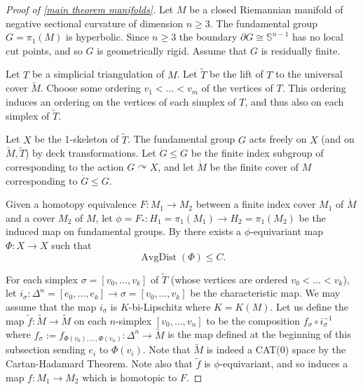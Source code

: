 \documentclass{amsart}
\numberwithin{equation}{section}
\theoremstyle{definition}
\newcommand{\bbS}{\mathbb{S}}
\newcommand{\actson}{\curvearrowright}
\newcommand{\homeo}{\cong}
\newcommand{\ii}{^{-1}}
\newcommand{\tild}[1]{\widetilde{#1}}
\DeclareMathOperator{\AD}{AvgDist}
\begin{document}
\begin{proof}[Proof of \cref{main theorem manifolds}]
Let $M$ be a closed Riemannian manifold of negative sectional curvature of dimension $n\ge 3$. 
The fundamental group $G = \pi_1(M)$ is hyperbolic. Since $n\ge 3$ the boundary $\partial G\homeo \bbS^{n-1}$ has no local cut points, and so $G$ is geometrically rigid.
Assume that $G$ is residually finite.

Let $T$ be a simplicial triangulation of $M$.
Let $\tild T$ be the lift of $T$ to the universal cover $\tild M$. 
Choose some ordering $v_1<\dots <v_m$ of the vertices of $T$. 
This ordering induces an ordering on the vertices of each simplex of $T$, and thus also on each simplex of $\tild T$.



Let $X$ be the 1-skeleton of $\tild T$.
The fundamental group $G$ acts freely on $X$ 
(and on $\tild M,\tild T$) by deck transformations.
Let $\dot G\le G$ be the finite index subgroup of  corresponding to the action $G\actson X$, and let $\dot M$ be the finite cover of $M$ corresponding to $\dot G\le G$.

Given a homotopy equivalence $F:M_1\to M_2$ between a finite index cover $M_1$ of $\dot M$ and a cover $M_2$ of $M$, let $\phi=F_*:H_1=\pi_1(M_1)\to H_2=\pi_1(M_2)$ be the induced map on fundamental groups.
By  there exists a $\phi$-equivariant map $\Phi:X\to X$ such that 
\begin{equation}\label{avgdist inequality for smooth proof}
    \AD(\Phi)\le C.
\end{equation}

For each simplex $\sigma=[v_0,\dots,v_k]$ of $\tild T$ (whose vertices are ordered $v_0<\dots<v_k$), let $i_\sigma:\Delta^n=[e_0,\dots,e_k]\to \sigma=[v_0,\dots,v_k]$ be the characteristic map.
We may assume that the map $i_\sigma$ is $K$-bi-Lipschitz where $K=K(M)$.
Let us define the map $\tild f:\tild M\to \tild M$ on each $n$-simplex $[v_0,\dots,v_n]$ to be the composition $f_\sigma\circ i_\sigma\ii $ where $f_\sigma := f_{\Phi(v_0),\dots,\Phi(v_n)}:\Delta^n\to \tild M$ is the map defined at the beginning of this subsection sending $e_i$ to $\Phi(v_i)$.
Note that $\tild M$ is indeed a CAT(0) space by the Cartan-Hadamard Theorem. 
Note also that $\tild f$ is $\phi$-equivariant, and so induces a map $f:M_1\to M_2$ which is homotopic to $F$.


\end{proof}
\end{document}
